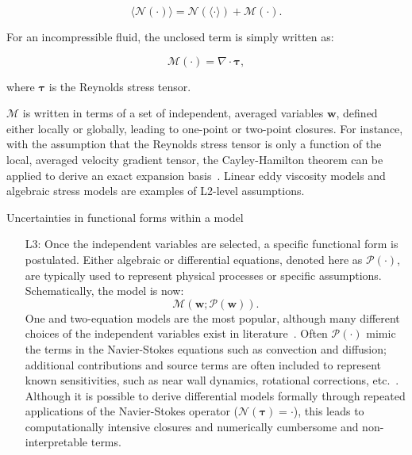 \documentclass[a4paper]{ar-1col}
\begin{document}
\begin{itemize}
\begin{itemize}
\begin{equation}
\langle \mathcal N(\cdot) \rangle =  \mathcal N( \langle \cdot \rangle ) + \mathcal M (  \cdot  ).
\label{eq:L2}
\end{equation}


For an incompressible fluid, the unclosed term is simply written as:

\begin{equation}
 \mathcal M (  \cdot  ) =  {\nabla} \cdot  \boldsymbol{\tau},
 \label{eq:L1b}
\end{equation}

 \noindent where $\boldsymbol{\tau}$ is the Reynolds stress tensor.


$\mathcal{M}$ is  written in
terms of a set of independent, averaged variables $  \mathbf{w} $,  defined either locally or globally, leading to one-point or two-point closures. 
For instance, with the assumption that the Reynolds stress tensor is only
a function of the local, averaged velocity gradient tensor, the Cayley-Hamilton theorem can be applied to derive an exact expansion basis~\citep{gatski2000nonlinear}. Linear eddy viscosity models and algebraic stress models are examples of L2-level assumptions.

\begin{marginnote}[]
 {Uncertainties in functional forms within a  model}
\end{marginnote}



\begin{itemize}
\item[L3:]
Once the independent variables are selected, a specific functional form is postulated. Either algebraic or differential equations, denoted here as $\mathcal P (  \cdot  )$, are typically used to 
 represent physical processes or specific assumptions. Schematically, the model is now:
 \begin{equation}
 \mathcal M (   \mathbf{w}; \mathcal P(  \mathbf{w}  ) ).
 \label{eq:L3}
 \end{equation}
  One and two-equation models are the most popular, although
 many different choices of the independent variables exist in  literature~\citep{wilcox2006turbulence}. Often $\mathcal P(  \cdot  )$ mimic the terms in the
 Navier-Stokes equations such as convection and diffusion; additional contributions and source terms are often included to represent known sensitivities,
 such as near wall dynamics, rotational  corrections, etc.~\citep{durbin2017some}.  Although it is possible to derive differential models formally through repeated applications of the Navier-Stokes operator ($  \mathcal N(  \boldsymbol{\tau}  ) = \cdot $),  this leads to computationally intensive closures and numerically cumbersome and non-interpretable terms.  


\end{itemize}
\end{itemize}
\end{itemize}
\end{document}
